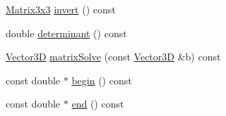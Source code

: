 \begin{DoxyCompactItemize}
\item 
\hyperlink{class_matrix3x3}{Matrix3x3} \hyperlink{class_matrix3x3_ac6c35af02989e2a20a0d661d665cc59d}{invert} () const 
\item 
double \hyperlink{class_matrix3x3_a8d069ee838151dfd79fef81a5992bebc}{determinant} () const 
\item 
\hyperlink{class_vector3_d}{Vector3\-D} \hyperlink{class_matrix3x3_a9e92abe88ebfa2f898ea1c3a008d7615}{matrix\-Solve} (const \hyperlink{class_vector3_d}{Vector3\-D} \&b) const 
\item 
const double $\ast$ \hyperlink{class_matrix3x3_ab6a79b3aca663ddb2362ee0639ffed3a}{begin} () const 
\item 
const double $\ast$ \hyperlink{class_matrix3x3_a2a4b6ee9463566d7aed3e1824e08d47e}{end} () const 
\end{DoxyCompactItemize}


